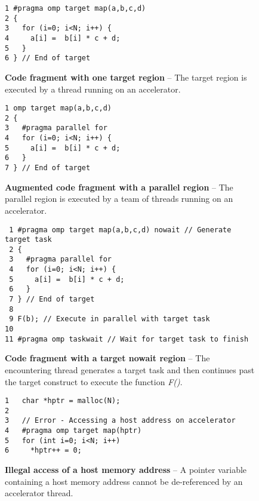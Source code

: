 \begin{figure*}[!tb]
\begin{verbatim}
1 #pragma omp target map(a,b,c,d)
2 {
3   for (i=0; i<N; i++) {
4     a[i] =  b[i] * c + d;
5   }
6 } // End of target
\end{verbatim}
\caption{ \textbf {Code fragment with one target region} -- \small
          The target region is executed by a thread running on
          an accelerator.
         }
\label{figure:chapter6-device-v1}
\end{figure*}


\begin{figure*}[!tbhp]
\begin{verbatim}
1 omp target map(a,b,c,d)
2 {
3   #pragma parallel for
4   for (i=0; i<N; i++) {
5     a[i] =  b[i] * c + d;
6   }
7 } // End of target
\end{verbatim}
\caption{ \textbf {Augmented code fragment with a parallel region} -- \small
          The parallel region is executed by a team of threads running
          on an accelerator.
        }
\label{figure:chapter6-device-v2}
\end{figure*}


\begin{figure*}[!tbh]
\begin{verbatim}
 1 #pragma omp target map(a,b,c,d) nowait // Generate target task
 2 {
 3   #pragma parallel for
 4   for (i=0; i<N; i++) {
 5     a[i] =  b[i] * c + d;
 6   }
 7 } // End of target
 8 
 9 F(b); // Execute in parallel with target task
10
11 #pragma omp taskwait // Wait for target task to finish
\end{verbatim}
\caption{ \textbf {Code fragment with a target nowait region} -- \small
          The encountering thread generates a target task 
          and then continues past the target construct
          to execute the function \emph{F()}.
         }
\label{figure:chapter6-nowait}
\end{figure*}


\begin{figure*}[!tb]
\begin{verbatim}
1   char *hptr = malloc(N);
2
3   // Error - Accessing a host address on accelerator
4   #pragma omp target map(hptr)
5   for (int i=0; i<N; i++)
6     *hptr++ = 0;
\end{verbatim}
\caption{ \textbf {Illegal access of a host memory address } -- \small
          A pointer variable containing a host memory address cannot be
          de-referenced by an accelerator thread.
         }
\label{figure:chapter6-devptr1}
\end{figure*}


